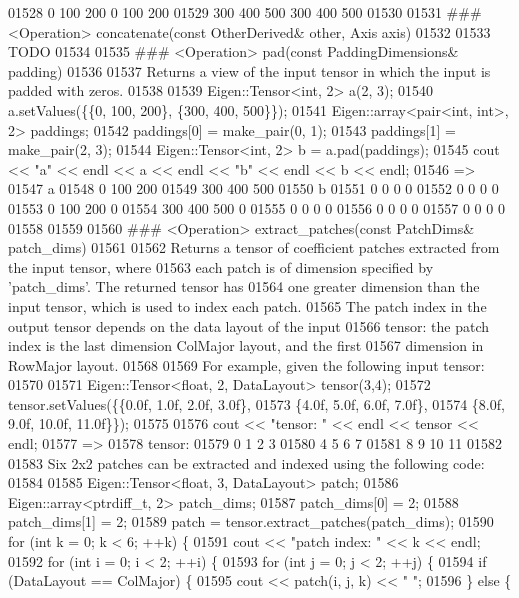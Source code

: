 \begin{DoxyCode}
01528        0   100   200    0   100   200
01529      300   400   500  300   400   500
01530 
01531 ### <Operation> concatenate(const OtherDerived& other, Axis axis)
01532 
01533 TODO
01534 
01535 ### <Operation>  pad(const PaddingDimensions& padding)
01536 
01537 Returns a view of the input tensor in which the input is padded with zeros.
01538 
01539     Eigen::Tensor<int, 2> a(2, 3);
01540     a.setValues(\{\{0, 100, 200\}, \{300, 400, 500\}\});
01541     Eigen::array<pair<int, int>, 2> paddings;
01542     paddings[0] = make\_pair(0, 1);
01543     paddings[1] = make\_pair(2, 3);
01544     Eigen::Tensor<int, 2> b = a.pad(paddings);
01545     cout << "a" << endl << a << endl << "b" << endl << b << endl;
01546     =>
01547     a
01548        0   100   200
01549      300   400   500
01550     b
01551        0     0     0    0
01552        0     0     0    0
01553        0   100   200    0
01554      300   400   500    0
01555        0     0     0    0
01556        0     0     0    0
01557        0     0     0    0
01558 
01559 
01560 ### <Operation>  extract\_patches(const PatchDims& patch\_dims)
01561 
01562 Returns a tensor of coefficient patches extracted from the input tensor, where
01563 each patch is of dimension specified by 'patch\_dims'. The returned tensor has
01564 one greater dimension than the input tensor, which is used to index each patch.
01565 The patch index in the output tensor depends on the data layout of the input
01566 tensor: the patch index is the last dimension ColMajor layout, and the first
01567 dimension in RowMajor layout.
01568 
01569 For example, given the following input tensor:
01570 
01571   Eigen::Tensor<float, 2, DataLayout> tensor(3,4);
01572   tensor.setValues(\{\{0.0f, 1.0f, 2.0f, 3.0f\},
01573                     \{4.0f, 5.0f, 6.0f, 7.0f\},
01574                     \{8.0f, 9.0f, 10.0f, 11.0f\}\});
01575 
01576   cout << "tensor: " << endl << tensor << endl;
01577 =>
01578 tensor:
01579  0   1   2   3
01580  4   5   6   7
01581  8   9  10  11
01582 
01583 Six 2x2 patches can be extracted and indexed using the following code:
01584 
01585   Eigen::Tensor<float, 3, DataLayout> patch;
01586   Eigen::array<ptrdiff\_t, 2> patch\_dims;
01587   patch\_dims[0] = 2;
01588   patch\_dims[1] = 2;
01589   patch = tensor.extract\_patches(patch\_dims);
01590   for (int k = 0; k < 6; ++k) \{
01591     cout << "patch index: " << k << endl;
01592     for (int i = 0; i < 2; ++i) \{
01593       for (int j = 0; j < 2; ++j) \{
01594         if (DataLayout == ColMajor) \{
01595           cout << patch(i, j, k) << " ";
01596         \} else \{

\end{DoxyCode}
